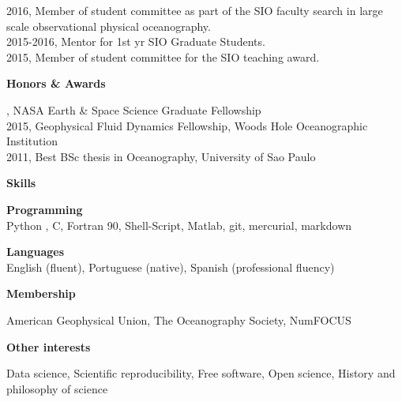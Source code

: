 \documentclass[a4paper,11pt,final]{memoir}
\newcommand{\Sep}{\vspace{1.25em}}
\newcommand{\SmallSep}{\vspace{0.5em}}
\newcommand{\CVSection}[1]
    {\Large\textbf{#1}\par
    \SmallSep\normalsize\normalfont}
\newcommand{\CVItem}[1]
    {\textbf{\color{NavyBlue} #1}}
\begin{document}
2016, Member of student committee as part of the
SIO faculty search in large scale observational physical oceanography.\\

2015-2016, Mentor for 1st yr SIO Graduate Students. \\

2015, Member of student committee for the SIO teaching award.





\Sep

\CVSection{Honors \& Awards}
2016, NASA Earth \& Space Science Graduate Fellowship\\
2015, Geophysical Fluid Dynamics Fellowship, Woods Hole Oceanographic Institution\\
2011, Best BSc thesis in Oceanography, University of Sao Paulo

\Sep

\CVSection{Skills}

\CVItem{Programming}\\
Python , C, Fortran 90, Shell-Script, Matlab, git, mercurial, markdown

\SmallSep

\CVItem{Languages}\\
English (fluent), Portuguese (native), Spanish (professional fluency)

\Sep

\CVSection{Membership}

 American Geophysical Union, The Oceanography Society, NumFOCUS

\Sep

\CVSection{Other interests}

Data science, Scientific reproducibility, Free software, Open science, History and philosophy of science

%
%
%
%
%
%
%
%
\end{document}
